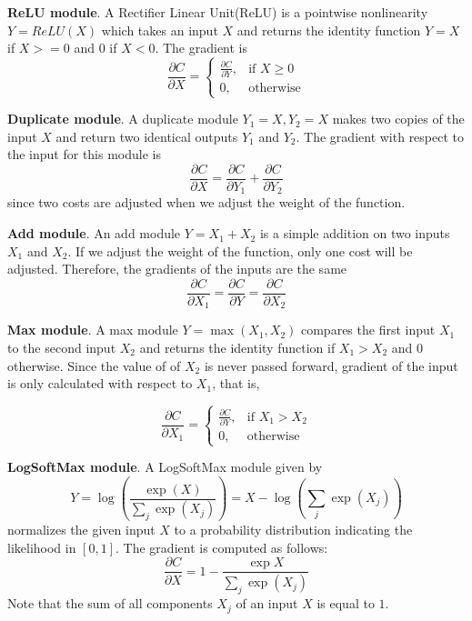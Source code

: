 \textbf{ReLU module}.
A Rectifier Linear Unit(ReLU) is a pointwise nonlinearity $Y=ReLU(X)$ which takes an input $X$ and returns the identity function $Y=X$ if $X>=0$ and $0$ if $X<0$.
The gradient is 
\begin{equation}
    \frac{\partial C}{\partial X} =
    \begin{cases}
     \frac{\partial C}{\partial Y}, &\text{if } X\geq 0 \\
      0 , &\text{otherwise}
    \end{cases}
\end{equation}

\textbf{Duplicate module}.
A duplicate module $Y_1=X, Y_2=X$ makes two copies of the input $X$ and return two identical outputs $Y_1$ and $Y_2$.
The gradient with respect to the input for this module is 
\[
\frac{\partial C}{\partial X} = \frac{\partial C}{\partial Y_1} + \frac{\partial C}{\partial Y_2}
\]
since two costs are adjusted when we adjust the weight of the function.

\textbf{Add module}.
An add module $Y=X_1+X_2$ is a simple addition on two inputs $X_1$ and $X_2$.
If we adjust the weight of the function, only one cost will be adjusted.
Therefore, the gradients of the inputs are the same
\[
\frac{\partial C}{\partial X_1} = \frac{\partial C}{\partial Y} = \frac{\partial C}{\partial X_2}
\]

\textbf{Max module}.
A max module $Y=\max(X_1,X_2)$ compares the first input $X_1$ to the second input $X_2$ and returns the identity function if $X_1>X_2$ and $0$ otherwise.
Since the value of of $X_2$ is never passed forward, gradient of the input is only calculated with respect to $X_1$, that is,

\begin{equation}
    \frac{\partial C}{\partial X_1} =
    \begin{cases}
     \frac{\partial C}{\partial Y}, &\text{if } X_1 > X_2 \\
      0 , &\text{otherwise}
    \end{cases}
\end{equation}

\textbf{LogSoftMax module}.
A LogSoftMax module given by
\[
Y=\log\left(\frac{\exp{(X)}}{\sum_j\exp{(X_j)}}\right) = X - \log\left(\sum_j\exp{(X_j)}\right)
\]
normalizes the given input $X$ to a probability distribution indicating the likelihood in $[0,1]$.
The gradient is computed as follows:
\[
\frac{\partial C}{\partial X} = 1 -  \frac{\exp{X}}{\sum_j\exp{(X_j)}}
\]
Note that the sum of all components $X_j$ of an input $X$ is equal to $1$.